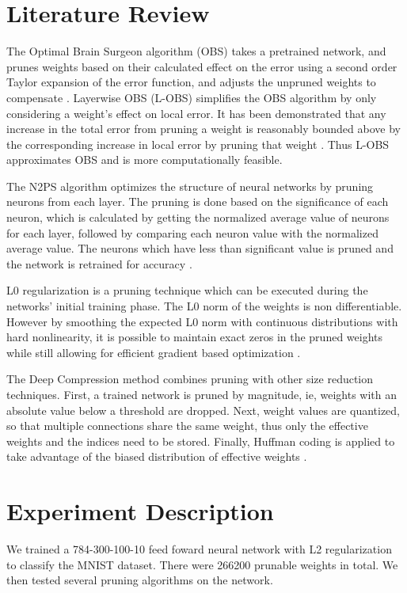 \documentclass{article}
\begin{document}
\section{Literature Review}
\label{Literature Review}
The Optimal Brain Surgeon algorithm (OBS) takes a pretrained network, and prunes weights based on their calculated effect on the error using a second order Taylor expansion of the error function, and adjusts the unpruned weights to compensate \cite{Hassibi93}. Layerwise OBS (L-OBS) simplifies the OBS algorithm by only considering a weight's effect on local error. It has been demonstrated that any increase in the total error from pruning a weight is reasonably bounded above by the corresponding increase in local error by pruning that weight \cite{Dong17}. Thus L-OBS approximates OBS and is more computationally feasible.

The N2PS algorithm optimizes the structure of neural networks by pruning neurons from each layer. The pruning is done based on the significance of each neuron, which is calculated by getting the normalized average value of neurons for each layer, followed by comparing each neuron value with the normalized average value. The neurons which have less than significant value is pruned and the network is retrained for accuracy \cite{Augasta11}.

L0 regularization is a pruning technique which can be executed during the networks' initial training phase. The L0 norm of the weights is non differentiable. However by smoothing the expected L0 norm with continuous distributions with hard nonlinearity, it is possible to maintain exact zeros in the pruned weights while still allowing for efficient gradient based optimization \cite{Louizos17}. 

The Deep Compression method combines pruning with other size reduction techniques. First, a trained network is pruned by magnitude, ie, weights with an absolute value below a threshold are dropped. Next, weight values are quantized, so that multiple connections share the same weight, thus only the effective weights and the indices need to be stored. Finally, Huffman coding is applied to take advantage of the biased distribution of effective weights \cite{Han15}.

\section{Experiment Description}
\label{Experiment Description} We trained a 784-300-100-10 feed foward neural network with L2 regularization to classify the MNIST dataset. There were 266200 prunable weights in total. We then tested several pruning algorithms on the network. 
\end{document}
